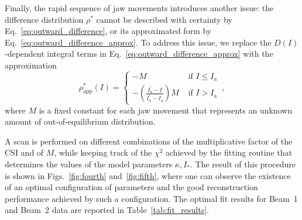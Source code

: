 Finally, the rapid sequence of jaw movements introduces another issue: the difference distribution $\rho^\ast$ cannot be described with certainty by Eq.~\eqref{eq:outward_difference}, or its approximated form by Eq.~\eqref{eq:outward_difference_approx}. To address this issue, we replace the $D(I)$-dependent integral terms in Eq.~\eqref{eq:outward_difference_approx} with the approximation
\begin{equation}
    \rho_{\mathrm{app}}^{\ast}(I)= \begin{cases} -M & \text { if } I\leq I_{\mathrm{a}}\\ -\left(\frac{I_{\mathrm{a}}^{\prime }-I}{I_{\mathrm{a}}^{ \prime}-I_{\mathrm{a}}}\right) M & \text { if } I>I_{\mathrm{a}}  \end{cases} \, ,
    \label{eq:approximated_distribution_beam}
\end{equation}
where $M$ is a fixed constant for each jaw movement that represents an unknown amount of out-of-equilibrium distribution.

A scan is performed on different combinations of the multiplicative factor of the CSI and of $M$, while keeping track of the $\chi^2$ achieved by the fitting routine that determines the values of the model parameters $\kappa, I_\ast$. The result of this procedure is shown in Figs.~\ref{fig:fourth} and~\ref{fig:fifth}, where one can observe the existence of an optimal configuration of parameters and the good reconstruction performance achieved by such a configuration. The optimal fit results for Beam~1 and Beam~2 data are reported in Table~\ref{tab:fit_results}.

